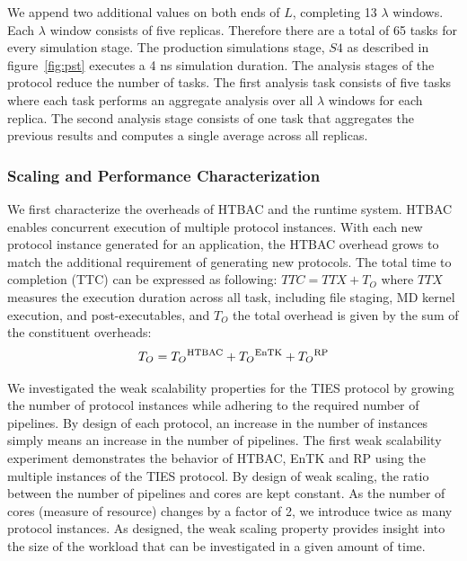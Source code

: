   We append two additional values on both ends of $L$, completing 13 $\lambda$
windows. Each $\lambda$ window consists of five replicas. Therefore there are
a total of 65 tasks for every simulation stage. The production simulations
stage, $S4$ as described in figure~\ref{fig:pst} executes a 4 ns simulation 
duration. The analysis stages of the protocol reduce the number of tasks.
The first analysis task consists of five tasks where each task performs an
aggregate analysis over all $\lambda$ windows for each replica.
The second analysis stage consists of one task that
aggregates the previous results and computes a single average across all
replicas.



\subsubsection{Scaling and Performance Characterization}

  We first characterize the overheads of HTBAC and the runtime system. HTBAC
enables concurrent execution of multiple protocol instances. With each new
protocol instance generated for an application, the HTBAC overhead grows to
match the additional requirement of generating new protocols.
The total time to completion (TTC) can be expressed as
following: $TTC = TTX + T_{O}$ where
 \(TTX\) measures the execution duration across all task, including file
 staging, MD kernel execution, and post-executables, and $T_{O}$ the total
overhead is given by the sum of the constituent overheads: $$T_{O} =
T_{O}\textsuperscript{HTBAC} + T_{O}\textsuperscript{EnTK} +
T_{O}\textsuperscript{RP}$$






We investigated the weak scalability properties for the TIES protocol by
growing the number of protocol instances while adhering to the required number
of pipelines. By design of each protocol, an increase in the number of
instances simply means an increase in the number of pipelines. The first weak
scalability experiment demonstrates the behavior of HTBAC, EnTK and RP using
the multiple instances of the TIES protocol. By design of weak scaling, the
ratio between the number of pipelines and cores are kept constant. As the
number of cores (measure of resource) changes by a factor of 2, we introduce
twice as many protocol instances. As designed, the weak scaling property
provides insight into the size of the workload that can be investigated in a
given amount of time.

